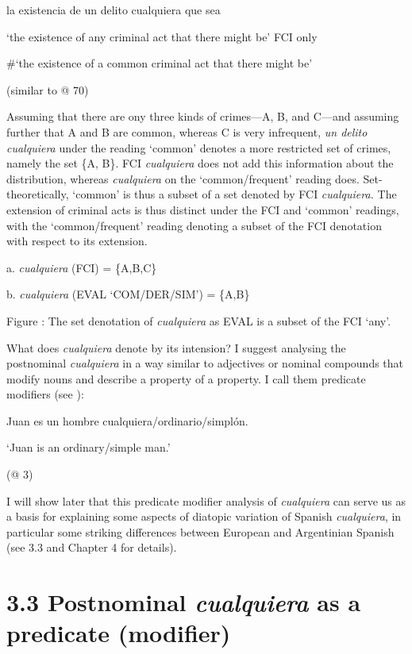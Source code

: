   la existencia de un delito cualquiera que sea

  ‘the existence of any criminal act that there might be’ FCI only

  \#‘the existence of a common criminal act that there might be’  

  (similar to @ 70)

Assuming that there are ony three kinds of crimes—A, B, and C—and assuming further that A and B are common, whereas C is very infrequent, \textit{un delito cualquiera} under the reading ‘common’ denotes a more restricted set of crimes, namely the set \{A, B\}. FCI \textit{cualquiera} does not add this information about the distribution, whereas \textit{cualquiera} on the ‘common/frequent’ reading does. Set-theoretically, ‘common’ is thus a subset of a set denoted by FCI \textit{cualquiera.} The extension of criminal acts is thus distinct under the FCI and ‘common’ readings, with the ‘common/frequent’ reading denoting a subset of the FCI denotation with respect to its extension.

\begin{table}
  a.  \textit{cualquiera} (FCI) = \{A,B,C\}

  b.  \textit{cualquiera} (EVAL ‘COM/DER/SIM’) = \{A,B\}

Figure : The set denotation of \textit{cualquiera} as EVAL is a subset of the FCI ‘any’.
\end{table}

What does \textit{cualquiera} denote by its intension? I suggest analysing the postnominal \textit{cualquiera} in a way similar to adjectives or nominal compounds that modify nouns and describe a property of a property. I call them predicate modifiers (see ):

  Juan es un hombre cualquiera/ordinario/simplón.

  ‘Juan is an ordinary/simple man.’

  (@ 3)

I will show later that this predicate modifier analysis of \textit{cualquiera} can serve us as a basis for explaining some aspects of diatopic variation of Spanish \textit{cualquiera}, in particular some striking differences between European and Argentinian Spanish (see 3.3 and Chapter 4 for details). 

\section{\textbf{3.3} \textbf{Postnominal} \textbf{\textit{cualquiera}} \textbf{as} \textbf{a} \textbf{predicate} \textbf{(modifier)}}

